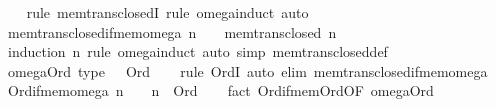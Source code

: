 \begin{isabellebody}
%
\isadelimproof
\ \ %
\endisadelimproof
%
\isatagproof
{}\isamarkupfalse%
\ {\isacharparenleft}{\kern0pt}rule\ mem{\isacharunderscore}{\kern0pt}trans{\isacharunderscore}{\kern0pt}closedI{\isacharcomma}{\kern0pt}\ rule\ omega{\isacharunderscore}{\kern0pt}induct{\isacharparenright}{\kern0pt}\ auto%
\endisatagproof
{\isafoldproof}%
%
\isadelimproof
\isanewline
%
\endisadelimproof
\isanewline
{}\isamarkupfalse%
\ mem{\isacharunderscore}{\kern0pt}trans{\isacharunderscore}{\kern0pt}closed{\isacharunderscore}{\kern0pt}if{\isacharunderscore}{\kern0pt}mem{\isacharunderscore}{\kern0pt}omega{\isacharcolon}{\kern0pt}\ {\isachardoublequoteopen}n\ {\isasymin}\ {\isasymomega}\ {\isasymLongrightarrow}\ mem{\isacharunderscore}{\kern0pt}trans{\isacharunderscore}{\kern0pt}closed\ n{\isachardoublequoteclose}\isanewline
%
\isadelimproof
\ \ %
\endisadelimproof
%
\isatagproof
{}\isamarkupfalse%
\ {\isacharparenleft}{\kern0pt}induction\ n\ rule{\isacharcolon}{\kern0pt}\ omega{\isacharunderscore}{\kern0pt}induct{\isacharparenright}{\kern0pt}\ {\isacharparenleft}{\kern0pt}auto\ simp{\isacharcolon}{\kern0pt}\ mem{\isacharunderscore}{\kern0pt}trans{\isacharunderscore}{\kern0pt}closed{\isacharunderscore}{\kern0pt}def{\isacharparenright}{\kern0pt}%
\endisatagproof
{\isafoldproof}%
%
\isadelimproof
\isanewline
%
\endisadelimproof
\isanewline
{}\isamarkupfalse%
\ omega{\isacharunderscore}{\kern0pt}Ord\ {\isacharbrackleft}{\kern0pt}type{\isacharbrackright}{\kern0pt}{\isacharcolon}{\kern0pt}\ {\isachardoublequoteopen}{\isasymomega}\ {\isacharcolon}{\kern0pt}\ Ord{\isachardoublequoteclose}\isanewline
%
\isadelimproof
\ \ %
\endisadelimproof
%
\isatagproof
{}\isamarkupfalse%
\ {\isacharparenleft}{\kern0pt}rule\ OrdI{\isacharparenright}{\kern0pt}\ {\isacharparenleft}{\kern0pt}auto\ elim{\isacharcolon}{\kern0pt}\ mem{\isacharunderscore}{\kern0pt}trans{\isacharunderscore}{\kern0pt}closed{\isacharunderscore}{\kern0pt}if{\isacharunderscore}{\kern0pt}mem{\isacharunderscore}{\kern0pt}omega{\isacharparenright}{\kern0pt}%
\endisatagproof
{\isafoldproof}%
%
\isadelimproof
\isanewline
%
\endisadelimproof
\isanewline
{}\isamarkupfalse%
\ Ord{\isacharunderscore}{\kern0pt}if{\isacharunderscore}{\kern0pt}mem{\isacharunderscore}{\kern0pt}omega{\isacharcolon}{\kern0pt}\ {\isachardoublequoteopen}n\ {\isasymin}\ {\isasymomega}\ {\isasymLongrightarrow}\ n\ {\isacharcolon}{\kern0pt}\ Ord{\isachardoublequoteclose}\isanewline
%
\isadelimproof
\ \ %
\endisadelimproof
%
\isatagproof
{}\isamarkupfalse%
\ {\isacharparenleft}{\kern0pt}fact\ Ord{\isacharunderscore}{\kern0pt}if{\isacharunderscore}{\kern0pt}mem{\isacharunderscore}{\kern0pt}Ord{\isacharbrackleft}{\kern0pt}OF\ omega{\isacharunderscore}{\kern0pt}Ord{\isacharbrackright}{\kern0pt}{\isacharparenright}{\kern0pt}%

\end{isabellebody}
